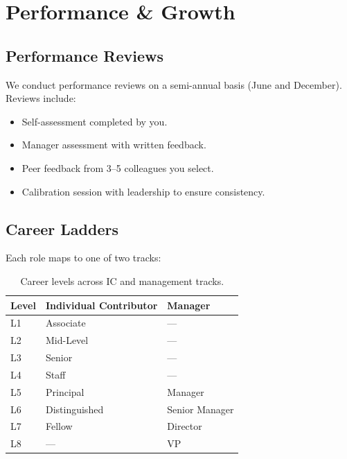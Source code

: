 \documentclass[
    language=english,
    doctype=employee-handbook,
    institution=none,
]{../../omnilatex}
\begin{document}
\section{Performance \& Growth}

\subsection{Performance Reviews}

We conduct performance reviews on a semi-annual basis (June and December).
Reviews include:

\begin{itemize}
    \item Self-assessment completed by you.
    \item Manager assessment with written feedback.
    \item Peer feedback from 3--5 colleagues you select.
    \item Calibration session with leadership to ensure consistency.
\end{itemize}

\subsection{Career Ladders}

Each role maps to one of two tracks:

\begin{table}[h]
    \centering
    \begin{tabular}{lll}
        \toprule
        \textbf{Level} & \textbf{Individual Contributor} & \textbf{Manager} \\
        \midrule
        L1  & Associate       & --- \\
        L2  & Mid-Level       & --- \\
        L3  & Senior          & --- \\
        L4  & Staff           & --- \\
        L5  & Principal       & Manager \\
        L6  & Distinguished   & Senior Manager \\
        L7  & Fellow          & Director \\
        L8  & ---             & VP \\
        \bottomrule
    \end{tabular}
    \caption{Career levels across IC and management tracks.}
\end{table}
\end{document}
